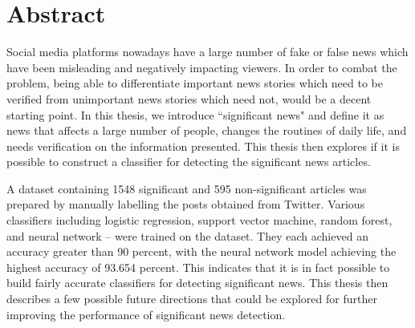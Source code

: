 \chapter*{Abstract}
\makeabstract

Social media platforms nowadays have a large number of fake or false news which have been misleading and negatively impacting viewers. In order to combat the problem, being able to differentiate important news stories which need to be verified from unimportant news stories which need not, would be a decent starting point. In this thesis, we introduce ``significant news" and define it as news that affects a large number of people, changes the routines of daily life, and needs verification on the information presented. This thesis then explores if it is possible to construct a classifier for detecting the significant news articles.

A dataset containing 1548 significant and 595 non-significant articles was prepared by manually labelling the posts obtained from Twitter. Various classifiers including logistic regression, support vector machine, random forest, and neural network -- were trained on the dataset. They each achieved an accuracy greater than 90 percent, with the neural network model achieving the highest accuracy of 93.654 percent. This indicates that it is in fact possible to build fairly accurate classifiers for detecting significant news. This thesis then describes a few possible future directions that could be explored for further improving the performance of significant news detection.


\abstractsig
